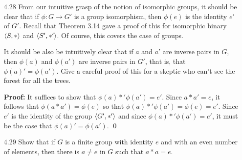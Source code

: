 \begin{enumerate}
   \item[4.28] From our intuitive grasp of the notion of isomorphic groups, it
               should be clear that if $\phi : G \rightarrow G'$ is a group
               isomorphism, then $\phi(e)$ is the identity $e'$ of $G'$. Recall
               that Theorem 3.14 gave a proof of this for isomorphic binary
               $\langle S, * \rangle$ and $\langle S', *' \rangle$. Of course, this covers the case
               of groups.

               \quad It should be also be intuitively clear that if $a$ and $a'$
               are inverse pairs in $G$, then $\phi(a)$ and $\phi(a')$ are
               inverse pairs in $G'$, that is, that $\phi(a)' = \phi(a')$. Give 
               a careful proof of this for a skeptic who can't see the forest 
               for all the trees.

      \textbf{Proof:} It suffices to show that $\phi(a) *' \phi(a') = e'$. Since
      $a * a' = e$, it follows that $\phi(a * a') = \phi(e)$ so that
      $\phi(a) *' \phi(a') = \phi(e) = e'$. Since $e'$ is the identity of the
      group $\langle G', *' \rangle$ and since $\phi(a) *' \phi(a') = e'$, it must be the
      case that $\phi(a)' = \phi(a')$. \qed
   \item[4.29] Show that if $G$ is a finite group with identity $e$ and with an
               even number of elements, then there is $a \neq e$ in $G$ such
               that $a * a = e$.
      

\end{enumerate}
